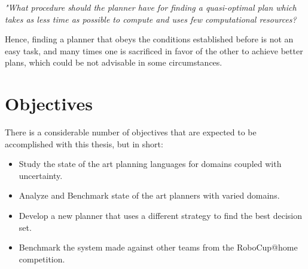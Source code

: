 \textit{"What procedure should the planner have for finding a
quasi-optimal plan which takes as less time as possible to compute and uses few
computational resources?}

Hence, finding a planner that obeys the conditions established before is not an
easy task, and many times one is sacrificed in favor of the other to achieve
better plans, which could be not advisable in some circumstances.


\section{Objectives}
There is a considerable number of objectives that are expected to be
accomplished with this thesis, but in short:
\begin{itemize}
    \item Study the state of the art planning languages for domains coupled with
    uncertainty.
    \item Analyze and Benchmark state of the art planners with varied domains.
    \item Develop a new planner that uses a different strategy to find the best
    decision set.
    \item Benchmark the system made against other teams from the RoboCup@home
    competition.
\end{itemize}
